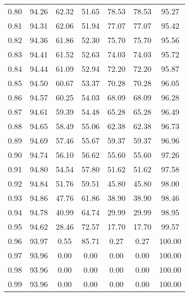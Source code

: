 \begin{tabular}{|c|c|c|c|c|c|c|}
      0.80 &     94.26 &     62.32 &      51.65 &   78.53 &      78.53 &         95.27 \\
      0.81 &     94.31 &     62.06 &      51.94 &   77.07 &      77.07 &         95.42 \\
      0.82 &     94.36 &     61.86 &      52.30 &   75.70 &      75.70 &         95.56 \\
      0.83 &     94.41 &     61.52 &      52.63 &   74.03 &      74.03 &         95.72 \\
      0.84 &     94.44 &     61.09 &      52.94 &   72.20 &      72.20 &         95.87 \\
      0.85 &     94.50 &     60.67 &      53.37 &   70.28 &      70.28 &         96.05 \\
      0.86 &     94.57 &     60.25 &      54.03 &   68.09 &      68.09 &         96.28 \\
      0.87 &     94.61 &     59.39 &      54.48 &   65.28 &      65.28 &         96.49 \\
      0.88 &     94.65 &     58.49 &      55.06 &   62.38 &      62.38 &         96.73 \\
      0.89 &     94.69 &     57.46 &      55.67 &   59.37 &      59.37 &         96.96 \\
      0.90 &     94.74 &     56.10 &      56.62 &   55.60 &      55.60 &         97.26 \\
      0.91 &     94.80 &     54.54 &      57.80 &   51.62 &      51.62 &         97.58 \\
      0.92 &     94.84 &     51.76 &      59.51 &   45.80 &      45.80 &         98.00 \\
      0.93 &     94.86 &     47.76 &      61.86 &   38.90 &      38.90 &         98.46 \\
      0.94 &     94.78 &     40.99 &      64.74 &   29.99 &      29.99 &         98.95 \\
      0.95 &     94.62 &     28.46 &      72.57 &   17.70 &      17.70 &         99.57 \\
      0.96 &     93.97 &      0.55 &      85.71 &    0.27 &       0.27 &        100.00 \\
      0.97 &     93.96 &      0.00 &       0.00 &    0.00 &       0.00 &        100.00 \\
      0.98 &     93.96 &      0.00 &       0.00 &    0.00 &       0.00 &        100.00 \\
      0.99 &     93.96 &      0.00 &       0.00 &    0.00 &       0.00 &        100.00 \\
\bottomrule
\end{tabular}

